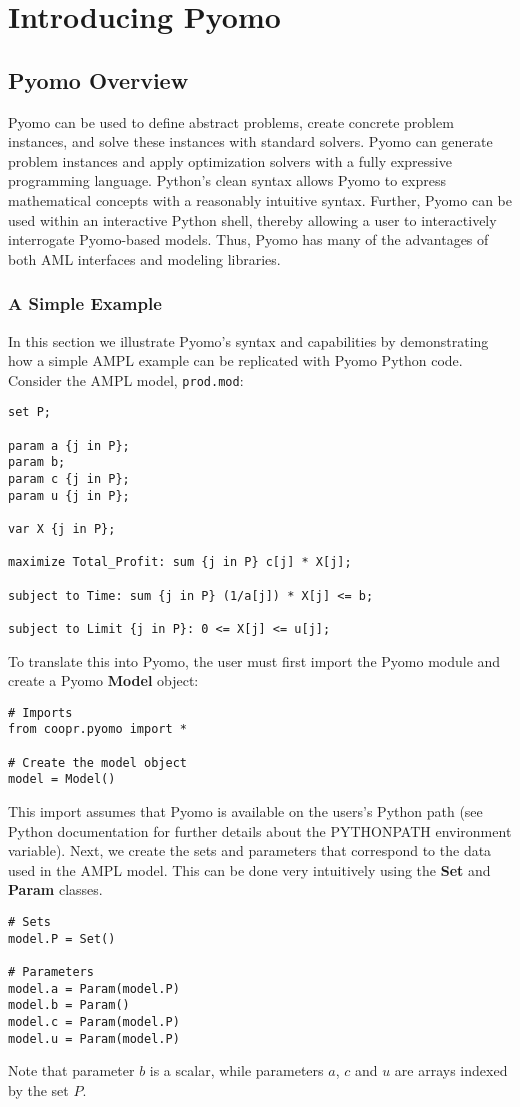 
\chapter{Introducing Pyomo}

\section{Pyomo Overview}
\label{sec:pyomo}

Pyomo can be used to define abstract problems, create concrete problem
instances, and solve these instances with standard solvers.  Pyomo can
generate problem instances and apply optimization solvers with a fully
expressive programming language.  Python's clean syntax allows Pyomo
to express mathematical concepts with a reasonably intuitive syntax.
Further, Pyomo can be used within an interactive Python shell, thereby
allowing a user to interactively interrogate Pyomo-based models.  Thus,
Pyomo has many of the advantages of both AML interfaces and modeling
libraries.

\subsection{A Simple Example}
\label{sec:example}

In this section we illustrate Pyomo's syntax and capabilities by
demonstrating how a simple AMPL example can be replicated with Pyomo Python
code.  Consider the AMPL model, {\tt prod.mod}:
\begin{lstlisting}
set P;

param a {j in P};
param b;
param c {j in P};
param u {j in P};

var X {j in P};

maximize Total_Profit: sum {j in P} c[j] * X[j];

subject to Time: sum {j in P} (1/a[j]) * X[j] <= b;

subject to Limit {j in P}: 0 <= X[j] <= u[j];
\end{lstlisting}

To translate this into Pyomo, the user must first import the Pyomo
module and create a Pyomo {\bf Model} object:
\begin{lstlisting}
# Imports
from coopr.pyomo import *

# Create the model object
model = Model()
\end{lstlisting}
This import assumes that Pyomo is available on the users's Python path (see Python documentation for further details about the PYTHONPATH environment variable).  Next, we create the sets and parameters that correspond to the data used in the AMPL model.  This can be done very intuitively using the {\bf Set} and {\bf Param} classes.
\begin{lstlisting}
# Sets
model.P = Set()

# Parameters
model.a = Param(model.P)
model.b = Param()
model.c = Param(model.P)
model.u = Param(model.P)
\end{lstlisting}
Note that parameter $b$ is a scalar, while parameters $a$, $c$ and $u$ are arrays indexed by the set $P$.


